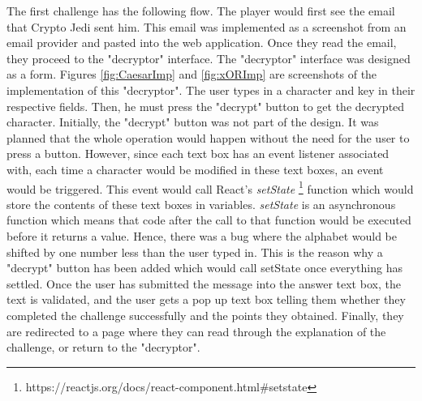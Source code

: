 \documentclass{l4proj}
\begin{document}
The first challenge has the following flow. 
The player would first see the email that Crypto Jedi sent him. 
This email was implemented as a screenshot from an email provider and pasted into the web application.
Once they read the email, they proceed to the "decryptor" interface. 
The "decryptor" interface was designed as a form. 
Figures \ref{fig:CaesarImp} and \ref{fig:xORImp} are screenshots of the implementation of this "decryptor".
The user types in a character and key in their respective fields. 
Then, he must press the "decrypt" button to get the decrypted character.
Initially, the "decrypt" button was not part of the design. 
It was planned that the whole operation would happen without the need for the user to press a button.
However, since each text box has an event listener associated with, 
each time a character would be modified in these text boxes, an event would be triggered. 
This event would call React's \textit{setState} \footnote{https://reactjs.org/docs/react-component.html\#setstate} function 
which would store the contents of these text boxes in variables.
\textit{setState} is an asynchronous function which means that code after the call to that function would be executed 
before it returns a value. Hence, there was a bug where the alphabet would be shifted by one number less than the user typed in.
This is the reason why a "decrypt" button has been added which would call setState once everything has settled. 
Once the user has submitted the message into the answer text box, the text is validated, 
and the user gets a pop up text box telling them whether they completed the challenge successfully and the points they obtained.
Finally, they are redirected to a page where they can read through the explanation of the challenge, or return to the "decryptor".
\end{document}
